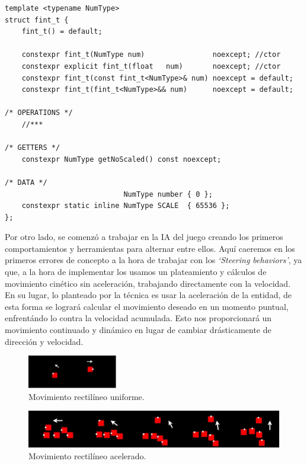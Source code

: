 \begin{lstlisting}[style=CodigoC++, caption={Entero coma fija},label=fint_t]
template <typename NumType>
struct fint_t {
    fint_t() = default;

    constexpr fint_t(NumType num)                noexcept; //ctor
    constexpr explicit fint_t(float   num)       noexcept; //ctor
    constexpr fint_t(const fint_t<NumType>& num) noexcept = default; 
    constexpr fint_t(fint_t<NumType>&& num)      noexcept = default;

/* OPERATIONS */
	//***

/* GETTERS */
    constexpr NumType getNoScaled() const noexcept;
    
/* DATA */    
                            NumType number { 0 };
    constexpr static inline NumType SCALE  { 65536 };
};
\end{lstlisting}


Por otro lado, se comenzó a trabajar en la \ac{IA} del juego creando los primeros comportamientos
y herramientas para alternar entre ellos. Aquí caeremos en los primeros errores de concepto a la
hora de trabajar con los \textit{`Steering behaviors'}, ya que, a la hora de implementar los
usamos un plateamiento y cálculos de movimiento cinético sin aceleración, trabajando directamente 
con la velocidad.\\
En su lugar, lo planteado por la técnica es usar la aceleración de la entidad, de esta forma se 
logrará calcular el movimiento deseado en un momento puntual, enfrentándo lo contra la velocidad 
acumulada. Esto nos proporcionará un movimiento continuado y dinámico en lugar de cambiar drásticamente de 
dirección y velocidad.

\begin{figure}[htb]
\centering
\includegraphics[width=0.35\textwidth]{imagenes/diario_desarrollo/mov1.png}
\caption{Movimiento rectilíneo uniforme.}
\label{fig:mru}
\end{figure} 

\begin{figure}[htb]
\centering
\includegraphics[width=1\textwidth]{imagenes/diario_desarrollo/mov2.png}
\caption{Movimiento rectilíneo acelerado.}
\label{fig:mra}
\end{figure} 

